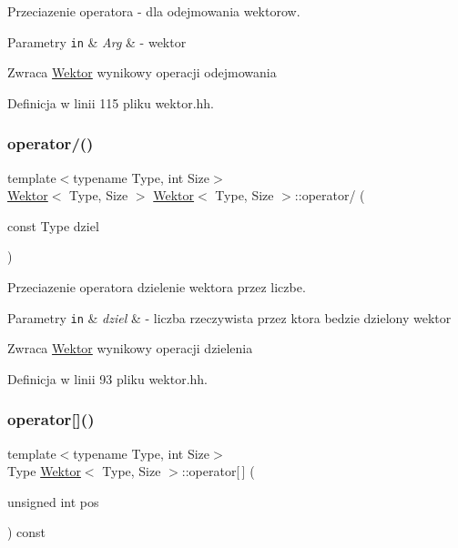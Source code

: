 Przeciazenie operatora -\/ dla odejmowania wektorow. 


\begin{DoxyParams}[1]{Parametry}
\mbox{\tt in}  & {\em Arg} & -\/ wektor \\
\hline
\end{DoxyParams}
\begin{DoxyReturn}{Zwraca}
\hyperlink{class_wektor}{Wektor} wynikowy operacji odejmowania 
\end{DoxyReturn}


Definicja w linii 115 pliku wektor.\+hh.

\mbox{\label{class_wektor_a3f2007dcd0270b8fe90e4e15704f34e6}} 
\subsubsection{\texorpdfstring{operator/()}{operator/()}}
{\footnotesize\ttfamily template$<$typename Type, int Size$>$ \\
\hyperlink{class_wektor}{Wektor}$<$ Type, Size $>$ \hyperlink{class_wektor}{Wektor}$<$ Type, Size $>$\+::operator/ (\begin{DoxyParamCaption}\item[{const Type}]{dziel }\end{DoxyParamCaption})}



Przeciazenie operatora dzielenie wektora przez liczbe. 


\begin{DoxyParams}[1]{Parametry}
\mbox{\tt in}  & {\em dziel} & -\/ liczba rzeczywista przez ktora bedzie dzielony wektor \\
\hline
\end{DoxyParams}
\begin{DoxyReturn}{Zwraca}
\hyperlink{class_wektor}{Wektor} wynikowy operacji dzielenia 
\end{DoxyReturn}


Definicja w linii 93 pliku wektor.\+hh.

\mbox{\label{class_wektor_a82fc83547c00b3ccb3ef82d8dc39cfd1}} 
\subsubsection{\texorpdfstring{operator[]()}{operator[]()}\hspace{0.1cm}{\footnotesize\ttfamily [1/2]}}
{\footnotesize\ttfamily template$<$typename Type, int Size$>$ \\
Type \hyperlink{class_wektor}{Wektor}$<$ Type, Size $>$\+::operator\mbox{[}$\,$\mbox{]} (\begin{DoxyParamCaption}\item[{unsigned int}]{pos }\end{DoxyParamCaption}) const\hspace{0.3cm}{\ttfamily [inline]}}



